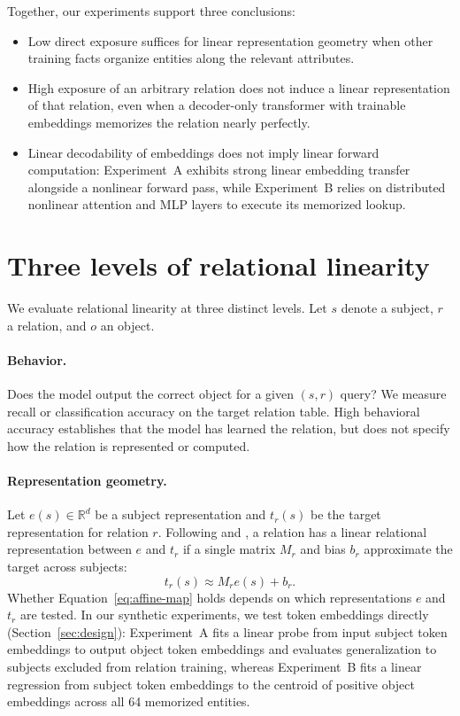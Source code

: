 \documentclass[11pt]{article}
\begin{document}
Together, our experiments support three conclusions:

\begin{itemize}
  \item Low direct exposure suffices for linear representation geometry when
  other training facts organize entities along the relevant attributes.
  \item High exposure of an arbitrary relation does not induce a linear
  representation of that relation, even when a decoder-only transformer with
  trainable embeddings memorizes the relation nearly perfectly.
  \item Linear decodability of embeddings does not imply linear forward
  computation: Experiment~A exhibits strong linear embedding transfer alongside
  a nonlinear forward pass, while Experiment~B relies on distributed nonlinear
  attention and MLP layers to execute its memorized lookup.
\end{itemize}



\section{Three levels of relational linearity}
\label{sec:definitions}

We evaluate relational linearity at three distinct levels.
Let $s$ denote a subject, $r$ a relation, and $o$ an object.

\paragraph{Behavior.}
Does the model output the correct object for a given $(s, r)$ query? We measure
recall or classification accuracy on the target relation table. High behavioral
accuracy establishes that the model has learned the relation, but does not
specify how the relation is represented or computed.

\paragraph{Representation geometry.}
Let $e(s)\in\mathbb{R}^d$ be a subject representation and $t_r(s)$ be the target
representation for relation $r$. Following \citet{hernandez2024linearity} and
\citet{merullo2025frequency}, a relation has a linear relational representation
between $e$ and $t_r$ if a single matrix $M_r$ and bias $b_r$ approximate the
target across subjects:
\begin{equation}
  t_r(s) \approx M_r e(s)+b_r.
  \label{eq:affine-map}
\end{equation}
Whether Equation~\ref{eq:affine-map} holds depends on which representations $e$
and $t_r$ are tested. In our synthetic experiments, we test token embeddings
directly (Section~\ref{sec:design}): Experiment~A fits a linear probe from input
subject token embeddings to output object token embeddings and evaluates
generalization to subjects excluded from relation training, whereas Experiment~B
fits a linear regression from subject token embeddings to the centroid of
positive object embeddings across all 64 memorized entities.
\end{document}
